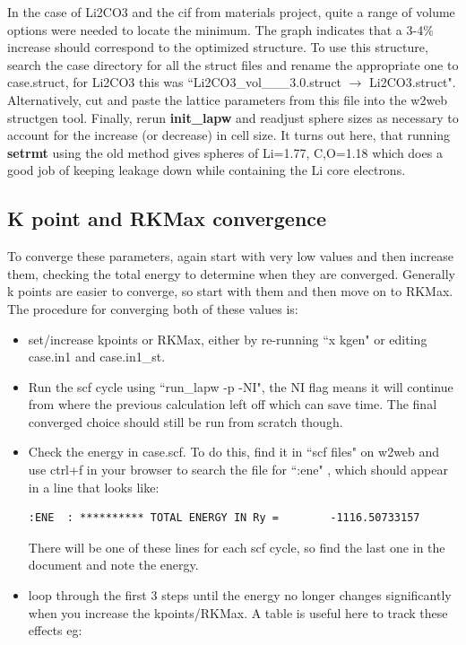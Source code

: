 \documentclass[12pt]{article}
\begin{document}
In the case of Li2CO3 and the cif from materials project, quite a range of volume options were needed to locate the minimum.  The graph indicates that a 3-4\% increase should correspond to the optimized structure.    To use this structure, search the case directory for all the struct files and rename the appropriate one to case.struct, for Li2CO3 this was ``Li2CO3\_vol\_\_\_3.0.struct $\to$ Li2CO3.struct". Alternatively, cut and paste the lattice parameters from this file into the w2web structgen tool.    Finally, rerun \textbf{init\_lapw} and readjust sphere sizes as necessary to account for the increase (or decrease) in cell size. It turns out here, that running \textbf{setrmt} using the old method gives spheres of Li=1.77, C,O=1.18 which does a good job of keeping leakage down while containing the Li core electrons.  

\subsection{K point and RKMax convergence}

To converge these parameters, again start with very low values and then increase them, checking the total energy to determine when they are converged.  Generally k points are easier to converge, so start with them and then move on to RKMax. The procedure for converging both of these values is:

\begin{itemize}
	\item set/increase kpoints or RKMax, either by re-running ``x kgen" or editing case.in1 and case.in1\_st.
	
	\item Run the scf cycle using ``run\_lapw -p -NI", the NI flag means it will continue from where the previous calculation left off which can save time. The final converged choice should still be run from scratch though.
	
	\item Check the energy in case.scf.  To do this, find it in ``scf files" on w2web and use ctrl+f in your browser to search the file for ``:ene" , which should appear in a line that looks like: 
	
		\begin{lstlisting}
:ENE  : ********** TOTAL ENERGY IN Ry =        -1116.50733157
		\end{lstlisting}
	
	There will be one of these lines for each scf cycle, so find the last one in the document and note the energy. 
	
	
	\item loop through the first 3 steps until the energy no longer changes significantly when you increase the kpoints/RKMax.  A table is useful here to track these effects eg:
	
\end{itemize}
\end{document}
